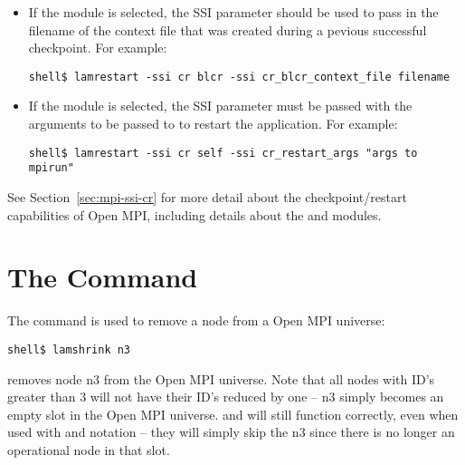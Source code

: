\begin{itemize}
\item If the  module is selected, the SSI parameter
   should be used to pass in
  the filename of the context file that was created during a pevious
  successful checkpoint.  For example:

\lstset{style=lam-cmdline}
\begin{lstlisting}
shell$ lamrestart -ssi cr blcr -ssi cr_blcr_context_file filename
\end{lstlisting}
  
\item If the  module is selected, the SSI parameter
   must be passed with the arguments
  to be passed to  to restart the application.  For
  example:

\lstset{style=lam-cmdline}
\begin{lstlisting}
shell$ lamrestart -ssi cr self -ssi cr_restart_args "args to mpirun"
\end{lstlisting}
\end{itemize}

See Section~\ref{sec:mpi-ssi-cr} for more detail about the
checkpoint/restart capabilities of Open MPI, including details about
the  and   modules.

\section{The  Command}
\label{sec:commands-lamshrink}

The  command is used to remove a node from a Open MPI
universe:

\lstset{style=lam-cmdline}
\begin{lstlisting}
shell$ lamshrink n3
\end{lstlisting}

\noindent removes node n3 from the Open MPI universe.  Note that all nodes
with ID's greater than 3 will not have their ID's reduced by one -- n3
simply becomes an empty slot in the Open MPI universe.   and
 will still function correctly, even when used with 
and  notation -- they will simply skip the n3 since there is no
longer an operational node in that slot.

